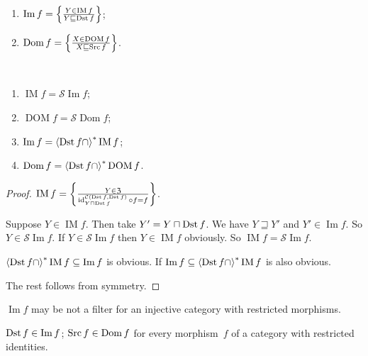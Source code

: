 \begin{defn}
~
\begin{enumerate}
\item $\operatorname{Im} f = \left\{ \frac{Y\in\operatorname{IM} f}{Y\sqsubseteq\operatorname{Dst} f}\right\}$;
\item $\operatorname{Dom} f = \left\{ \frac{X\in\operatorname{DOM} f}{X\sqsubseteq\operatorname{Src} f}\right\}$.
\end{enumerate}
\end{defn}

\begin{prop}
~
\begin{enumerate}
\item $\operatorname{IM} f = \mathscr{S}\operatorname{Im} f$;
\item $\operatorname{DOM} f = \mathscr{S}\operatorname{Dom} f$;
\item $\operatorname{Im} f = \left\langle \operatorname{Dst} f\cap\right\rangle ^{\ast}\operatorname{IM} f$;
\item $\operatorname{Dom} f = \left\langle \operatorname{Dst} f\cap\right\rangle ^{\ast}\operatorname{DOM} f$.
\end{enumerate}
\end{prop}

\begin{proof}
$\operatorname{IM} f =
\left\{ \frac{Y \in \mathfrak{Z}}{\operatorname{id}^{\mathcal{C}(\operatorname{Dst} f,\operatorname{Dst} f)}_{Y\sqcap\operatorname{Dst} f} \circ f = f}\right\}$.

Suppose $Y\in\operatorname{IM}f$. Then take $Y'=Y\sqcap\operatorname{Dst} f$. We have $Y\sqsupseteq Y'$ and $Y'\in\operatorname{Im}f$. So $Y\in\mathscr{S}\operatorname{Im}f$. If $Y\in\mathscr{S}\operatorname{Im}f$ then $Y\in\operatorname{IM}f$ obviously.
So $\operatorname{IM} f = \mathscr{S}\operatorname{Im} f$.

$\left\langle \operatorname{Dst} f\cap\right\rangle ^{\ast}\operatorname{IM}f\subseteq
\operatorname{Im}f$ is obvious. If
$\operatorname{Im}f\subseteq\left\langle \operatorname{Dst} f\cap\right\rangle ^{\ast}\operatorname{IM}f$ is also obvious.

The rest follows from symmetry.
\end{proof}

\begin{conjecture}
$\operatorname{Im} f$ may be not a filter for an injective
category with restricted morphisms.
\end{conjecture}

\begin{prop}\label{dst-in-im}
$\operatorname{Dst} f\in\operatorname{Im} f$; $\operatorname{Src} f\in\operatorname{Dom} f$ for every morphism~$f$ of a category with restricted
identities.
\end{prop}

